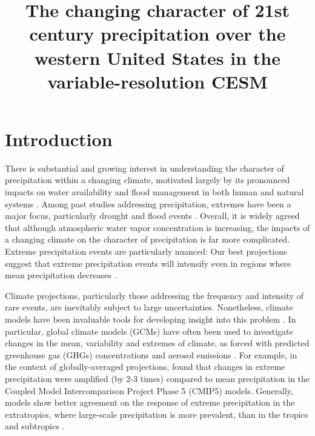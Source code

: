 \documentclass{ametsoc}
\title{The changing character of 21st century precipitation over the western United States in the variable-resolution CESM}
\affiliation{Department of Land, Air and Water Resources, University of California, Davis}
\begin{document}
\maketitle


%
\section{Introduction}

There is substantial and growing interest in understanding the character of precipitation within a changing climate, motivated largely by its pronounced impacts on water availability and flood management in both human and natural systems \citep{hegerl2004detectability, kharin2007changes, scoccimarro2013heavy}.  Among past studies addressing precipitation, extremes have been a major focus, particularly drought and flood events \citep{seneviratne2012changes}.  Overall, it is widely agreed that although atmospheric water vapor concentration is increasing, the impacts of a changing climate on the character of precipitation is far more complicated.  Extreme precipitation events are particularly nuanced:  Our best projections suggest that extreme precipitation events will intensify even in regions where mean precipitation decreases \citep{tebaldi2006going, kharin2007changes}.


Climate projections, particularly those addressing the frequency and intensity of rare events, are inevitably subject to large uncertainties.  Nonetheless, climate models have been invaluable tools for developing insight into this problem \citep{easterling2000climate}. In particular, global climate models (GCMs) have often been used to investigate changes in the mean, variability and extremes of climate, as forced with predicted greenhouse gas (GHGs) concentrations and aerosol emissions \citep{meehl2006future}. For example, in the context of globally-averaged projections, \cite{kharin2013changes} found that changes in extreme precipitation were amplified (by 2-3 times) compared to mean precipitation in the Coupled Model Intercomparison Project Phase 5 (CMIP5) models. Generally, models show better agreement on the response of extreme precipitation in the extratropics, where large-scale precipitation is more prevalent, than in the tropics and subtropics \citep{kharin2013changes, pendergrass2015does}.
\end{document}
